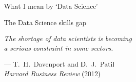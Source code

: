 \documentclass[12pt,aspectratio=169]{beamer}
\begin{document}
\begin{frame}{What I mean by `Data Science'}
\end{frame}

\begin{frame}{The Data Science skills gap}
    \begin{center}
        \Large\it%
        The shortage of data scientists is becoming \\[\medskipamount]
        a serious constraint in some sectors.
    \end{center}
    \vfill
    \begin{flushright}
        --- T.\ H.\ Davenport and D.\ J.\ Patil \\
            \textit{Harvard Business Review} (2012)
    \end{flushright}
\end{frame}
\end{document}
